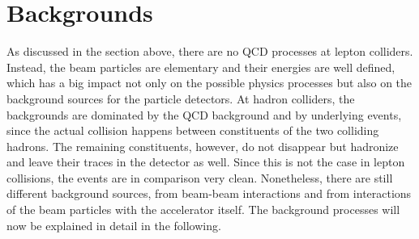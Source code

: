 \section{Backgrounds}
\label{Backgrounds}
As discussed in the section above, there are no QCD processes at lepton colliders.
Instead, the beam particles are elementary and their energies are well defined, which has a big impact not only on the possible physics processes but also on the background sources for the particle detectors.
At hadron colliders, the backgrounds are dominated by the QCD background and by underlying events, since the actual collision happens between constituents of the two colliding hadrons.
The remaining constituents, however, do not disappear but hadronize and leave their traces in the detector as well.
Since this is not the case in lepton collisions, the events are in comparison very clean.
Nonetheless, there are still different background sources, from beam-beam interactions and from interactions of the beam particles with the accelerator itself.
The background processes will now be explained in detail in the following.

